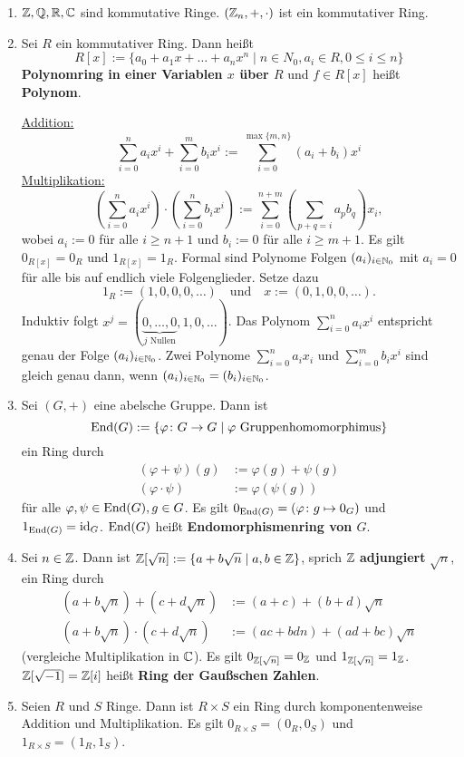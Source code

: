 \begin{beispiel}\label{beispiel4_3}
	\begin{enumerate}[label=(\arabic*)]
		\item $\mathbb{Z}, \mathbb{Q}, \mathbb{R}, \mathbb{C}$ sind kommutative Ringe. $(\mathbb{Z}_n, +, \cdot)$ ist ein kommutativer Ring.
		\item Sei $R$ ein kommutativer Ring. Dann heißt 
		\[R[x] := \{a_0 + a_1 x + \dots + a_n x^n \mid n \in N_0, a_i \in R, 0 \leq i \leq n\}\]
		\textbf{Polynomring in einer Variablen $x$ über $R$} und $f \in R[x]$ heißt \textbf{Polynom}. 
		
		\underline{Addition:} 
		\[\sum_{i=0}^n a_ix^i + \sum_{i=0}^m b_ix^i := \sum_{i=0}^{\max\{m,n\}} (a_i +b_i)x^i\]
		\underline{Multiplikation:}
		\[\left(\sum_{i=0}^n a_ix^i\right) \cdot \left(\sum_{i=0}^n b_ix^i\right) := \sum_{i=0}^{n+m} \left(\sum_{p+q = i} a_p b_q\right)x_i,\]
		wobei $a_i := 0$ für alle $i \geq n+1$ und $b_i := 0$ für alle $i \geq m+1$. Es gilt $0_{R[x]} = 0_R$ und $1_{R[x]} = 1_R$. Formal sind Polynome Folgen $(a_i)_{i \in \mathbb{N}_0}$ mit $a_i = 0$ für alle bis auf endlich viele Folgenglieder. Setze dazu 
		\[1_R := (1,0,0,0,\dots)\quad\text{und}\quad x := (0,1,0,0,\dots).\]
		Induktiv folgt $x^j = (\underbrace{0,\dots,0}_{j\text{ Nullen}}, 1, 0, \dots)$. Das Polynom $\sum_{i=0}^n a_i x^i $ entspricht genau der Folge $(a_i)_{i \in \mathbb{N}_0}$. Zwei Polynome $\sum_{i=0}^n a_i x_i$ und $\sum_{i=0}^m b_i x^i$ sind gleich genau dann, wenn $(a_i)_{i \in \mathbb{N}_0} = (b_i)_{i \in \mathbb{N}_0}$.
		\item Sei $(G,+)$ eine abelsche Gruppe. Dann ist 
		\[\mathrm{End}(G) := \{\varphi \colon G \to G \mid \varphi \text{ Gruppenhomomorphimus}\}\]
		ein Ring durch 
		\begin{align*}
			(\varphi + \psi)(g) &:= \varphi(g) + \psi(g)\\
			(\varphi \cdot \psi) &:= \varphi(\psi(g))
		\end{align*}
		für alle $\varphi, \psi \in \mathrm{End}(G), g \in G$. Es gilt $0_{\mathrm{End}(G)} = (\varphi\colon g \mapsto 0_G)$ und $1_{\mathrm{End}(G)} = \mathrm{id}_G$. $\mathrm{End}(G)$ heißt \textbf{Endomorphismenring von $G$}. 
		\item Sei $n \in \mathbb{Z}$. Dann ist $\mathbb{Z}[\sqrt{n}] := \{a + b \sqrt{n} \mid a,b \in \mathbb{Z}\}$, sprich $\mathbb{Z}$ \textbf{adjungiert} $\sqrt{n}$, ein Ring durch
		\begin{align*}
			(a + b \sqrt{n}) + (c + d \sqrt{n}) &:= (a+c) + (b+d)\sqrt{n}\\
			(a + b \sqrt{n}) \cdot (c + d \sqrt{n}) &:= (ac + bdn) + (ad + bc)\sqrt{n}
		\end{align*}
		(vergleiche Multiplikation in $\mathbb{C}$). Es gilt $0_{\mathbb{Z}[\sqrt{n}]} = 0_{\mathbb{Z}}$ und $1_{\mathbb{Z}[\sqrt{n}]} = 1_{\mathbb{Z}}$. $\mathbb{Z}[\sqrt{-1}] = \mathbb{Z}[i]$ heißt \textbf{Ring der Gaußschen Zahlen}.
		\item Seien $R$ und $S$ Ringe. Dann ist $R \times S$ ein Ring durch komponentenweise Addition und Multiplikation. Es gilt $0_{R \times S} = (0_R, 0_S)$ und $1_{R \times S} = (1_R, 1_S)$.
	\end{enumerate}
\end{beispiel}
